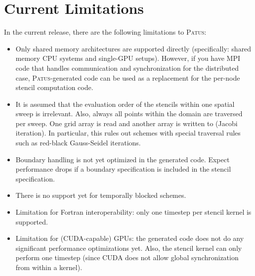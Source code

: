 \section{Current Limitations}

In the current release, there are the following limitations to \textsc{Patus}:
\begin{itemize}
  \item Only shared memory architectures are supported directly
    (specifically: shared memory CPU systems and single-GPU setups).
    However, if you have MPI code that handles communication and synchronization
    for the distributed case, \textsc{Patus}-generated code can be used as a replacement
    for the per-node stencil computation code.
    
  \item It is assumed that the evaluation order of the stencils within one spatial sweep is irrelevant.
    Also, always all points within the domain are traversed per sweep. One grid array is read and another
    array is written to (Jacobi iteration).
    In particular, this rules out schemes with special traversal rules such as red-black Gauss-Seidel
    iterations.
    
  \item Boundary handling is not yet optimized in the generated code.
    Expect performance drops if a boundary specification is included in the stencil specification.
  
    
  \item There is no support yet for temporally blocked schemes.

  \item Limitation for Fortran interoperability: only one timestep per stencil kernel is supported.
  
  \item Limitation for (CUDA-capable) GPUs: the generated code does not do any significant performance optimizations yet.
    Also, the stencil kernel can only perform one timestep (since CUDA does not allow global synchronization from within
    a kernel).
\end{itemize}

